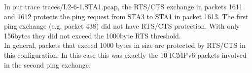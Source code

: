In our trace traces/L2-6-1.STA1.pcap, the RTS/CTS exchange in packets 1611 and 1612 protects the ping request from STA3 to STA1 in packet 1613. The first ping exchange (e.g. packet 438) did not have RTS/CTS protection. With only 156bytes they did not exceed the 1000byte RTS threshold.\\
In general, packets that exceed 1000 bytes in size are protected by RTS/CTS in this configuration. In this case this was exactly the 10 ICMPv6 packets involved in the second ping exchange.
